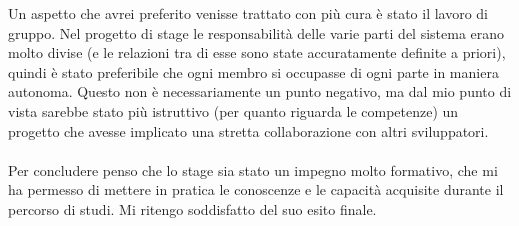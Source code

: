 Un aspetto che avrei preferito venisse trattato con più cura è stato il lavoro di gruppo. Nel progetto di stage le responsabilità delle varie parti del sistema erano molto divise (e le relazioni tra di esse sono state accuratamente definite a priori), quindi è stato preferibile che ogni membro si occupasse di ogni parte in maniera autonoma. Questo non è necessariamente un punto negativo, ma dal mio punto di vista sarebbe stato più istruttivo (per quanto riguarda le competenze) un progetto che avesse implicato una stretta collaborazione con altri sviluppatori. \\ \\

Per concludere penso che lo stage sia stato un impegno molto formativo, che mi ha permesso di mettere in pratica le conoscenze e le capacità acquisite durante il percorso di studi. Mi ritengo soddisfatto del suo esito finale.